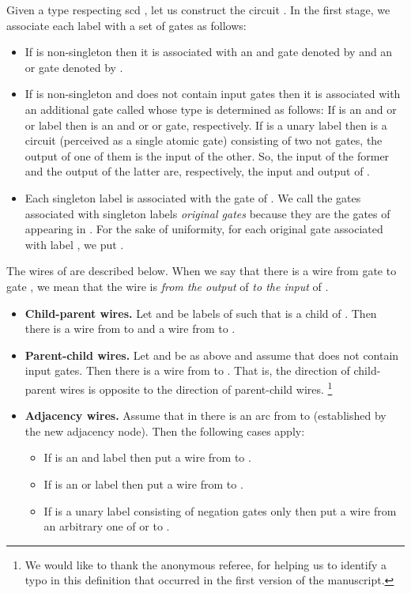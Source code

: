 \documentclass{llncs}
\begin{document}
Given a type respecting {\sc scd} , let us construct the circuit . 
In the first stage, we associate each label  with a set of gates as follows:
\begin{itemize}
\item If  is non-singleton then it is associated with an {\sc and} gate denoted by 
and an {\sc or} gate denoted by .
\item If  is non-singleton and does not contain input gates then it is associated with an additional
gate called  whose type is determined as follows: If  is an {\sc and} or {\sc or} label
then  is  an {\sc and} or {\sc or} gate, respectively. If  is a unary label then
 is a circuit (perceived as a single atomic gate) consisting of two {\sc not} gates, the output of
one of them is the input of the other. So, the input of the former and the output of the latter are,
respectively, the input and output of .
\item Each singleton label  is associated with the gate 
of . We call the gates associated with singleton labels \emph{original gates} because
they are the gates of  appearing in . For the sake of uniformity,
for each original gate  associated with label , we put .
\end{itemize}

The wires of  are described below. When we say that
there is a wire from gate  to gate , we mean that the wire is
\emph{from the output} of  \emph{to the input} of .
\begin{itemize}
\item {\bf Child-parent wires.}
Let  and  be labels of  such that
 is a child of . Then there is a wire from  to  and a wire from  to .
\item {\bf Parent-child wires.}
Let  and  be as above and assume that  does not contain input gates.
Then there is a wire from  to . That is, the direction of child-parent wires
is opposite to the direction of parent-child wires. \footnote{We would like to thank the anonymous
referee, for helping us to identify a typo in this definition that occurred in the first version of
the manuscript.}
\item {\bf Adjacency wires.} Assume that in  there is an arc from  to  (established by the new adjacency node). Then the following cases apply:
\begin{itemize}
\item If  is an {\sc and} label then put a wire from  to .
\item If  is an {\sc or} label then put a wire from  to .
\item If  is a unary label consisting of negation gates only then put a wire from
an arbitrary one of  or  to .
\end{itemize}
\end{itemize}
 
\end{document}
